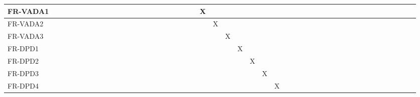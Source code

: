 \documentclass[12pt, titlepage]{article}
\begin{document}
\begin{landscape}
\begin{table}[!ht]
{\begin{tabular}{|l|l|l|l|l|l|l|l|l|l|l|l|l|l|l|l|l|l|l|l|l|l|l|l|l|l|l|l|l|l|l|l|l|}
        FR-VADA1 & ~ & ~ & ~ & ~ & ~ & ~ & ~ & ~ & ~ & ~ & ~ & ~ & ~ & X & ~ & ~ & ~ & ~ & ~ & ~ & ~ & ~ & ~ & ~ & ~ & ~ & ~ & ~ & ~ & ~ & ~ & ~ \\ \hline
        FR-VADA2 & ~ & ~ & ~ & ~ & ~ & ~ & ~ & ~ & ~ & ~ & ~ & ~ & ~ & ~ & X & ~ & ~ & ~ & ~ & ~ & ~ & ~ & ~ & ~ & ~ & ~ & ~ & ~ & ~ & ~ & ~ & ~ \\ \hline
        FR-VADA3 & ~ & ~ & ~ & ~ & ~ & ~ & ~ & ~ & ~ & ~ & ~ & ~ & ~ & ~ & ~ & X & ~ & ~ & ~ & ~ & ~ & ~ & ~ & ~ & ~ & ~ & ~ & ~ & ~ & ~ & ~ & ~ \\ \hline
        FR-DPD1 & ~ & ~ & ~ & ~ & ~ & ~ & ~ & ~ & ~ & ~ & ~ & ~ & ~ & ~ & ~ & ~ & X & ~ & ~ & ~ & ~ & ~ & ~ & ~ & ~ & ~ & ~ & ~ & ~ & ~ & ~ & ~ \\ \hline
        FR-DPD2 & ~ & ~ & ~ & ~ & ~ & ~ & ~ & ~ & ~ & ~ & ~ & ~ & ~ & ~ & ~ & ~ & ~ & X & ~ & ~ & ~ & ~ & ~ & ~ & ~ & ~ & ~ & ~ & ~ & ~ & ~ & ~ \\ \hline
        FR-DPD3 & ~ & ~ & ~ & ~ & ~ & ~ & ~ & ~ & ~ & ~ & ~ & ~ & ~ & ~ & ~ & ~ & ~ & ~ & X & ~ & ~ & ~ & ~ & ~ & ~ & ~ & ~ & ~ & ~ & ~ & ~ & ~ \\ \hline
        FR-DPD4 & ~ & ~ & ~ & ~ & ~ & ~ & ~ & ~ & ~ & ~ & ~ & ~ & ~ & ~ & ~ & ~ & ~ & ~ & ~ & X & ~ & ~ & ~ & ~ & ~ & ~ & ~ & ~ & ~ & ~ & ~ & ~ \\ \hline
    \end{tabular}
    }
\end{table}


\end{landscape}
\end{document}
